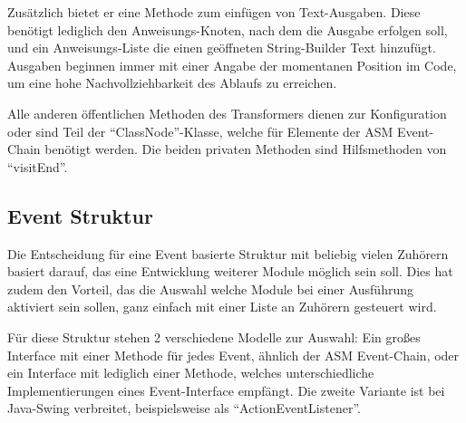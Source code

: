 Zusätzlich bietet er eine Methode zum einfügen von Text-Ausgaben. Diese benötigt lediglich den Anweisungs-Knoten, nach dem die Ausgabe erfolgen soll, und ein Anweisungs-Liste die einen geöffneten String-Builder Text hinzufügt. Ausgaben beginnen immer mit einer Angabe der momentanen Position im Code, um eine hohe Nachvollziehbarkeit des Ablaufs zu erreichen.

Alle anderen öffentlichen Methoden des Transformers dienen zur Konfiguration oder sind Teil der "`ClassNode"'-Klasse, welche für Elemente der ASM Event-Chain benötigt werden. Die beiden privaten Methoden sind Hilfsmethoden von "`visitEnd"'.

\subsection{Event Struktur} 

Die Entscheidung für eine Event basierte Struktur mit beliebig vielen Zuhörern basiert darauf, das eine Entwicklung weiterer Module möglich sein soll. Dies hat zudem den Vorteil, das die Auswahl welche Module bei einer Ausführung aktiviert sein sollen, ganz einfach mit einer Liste an Zuhörern gesteuert wird.

Für diese Struktur stehen 2 verschiedene Modelle zur Auswahl: Ein großes Interface mit einer Methode für jedes Event, ähnlich der ASM Event-Chain, oder ein Interface mit lediglich einer Methode, welches unterschiedliche Implementierungen eines Event-Interface empfängt. Die zweite Variante ist bei Java-Swing verbreitet, beispielsweise als "`ActionEventListener"'.

